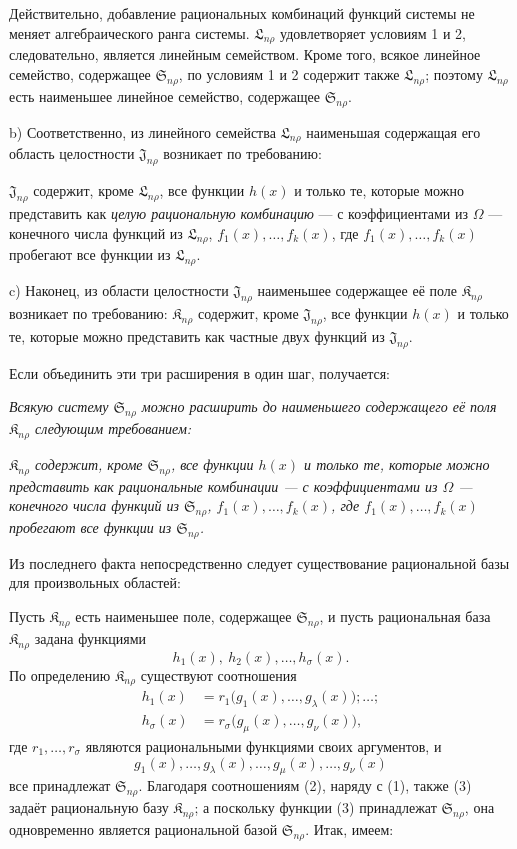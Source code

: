 \documentclass[11pt]{article}
\providecommand{\Kfield}{\mathfrak{K}}
\providecommand{\Ssys}{\mathfrak{S}}
\providecommand{\Jdom}{\mathfrak{J}}
\providecommand{\Lsys}{\mathfrak{L}}
\begin{document}
Действительно, добавление рациональных комбинаций функций системы не меняет алгебраического ранга системы. $\Lsys_{n\rho}$ удовлетворяет условиям 1 и 2, следовательно, является линейным семейством. Кроме того, всякое линейное семейство, содержащее $\Ssys_{n\rho}$, по условиям 1 и 2 содержит также $\Lsys_{n\rho}$; поэтому $\Lsys_{n\rho}$ есть наименьшее линейное семейство, содержащее $\Ssys_{n\rho}$.

b) Соответственно, из линейного семейства $\Lsys_{n\rho}$ наименьшая содержащая его область целостности $\Jdom_{n\rho}$ возникает по требованию:

$\Jdom_{n\rho}$ содержит, кроме $\Lsys_{n\rho}$, все функции $h(x)$ и только те, которые можно представить как \emph{целую рациональную комбинацию} --- с коэффициентами из $\Omega$ --- конечного числа функций из $\Lsys_{n\rho}$, $f_1(x),\ldots,f_k(x)$, где $f_1(x),\ldots,f_k(x)$ пробегают все функции из $\Lsys_{n\rho}$.

c) Наконец, из области целостности $\Jdom_{n\rho}$ наименьшее содержащее её поле $\Kfield_{n\rho}$ возникает по требованию: $\Kfield_{n\rho}$ содержит, кроме $\Jdom_{n\rho}$, все функции $h(x)$ и только те, которые можно представить как частные двух функций из $\Jdom_{n\rho}$.

Если объединить эти три расширения в один шаг, получается:

\emph{Всякую систему $\Ssys_{n\rho}$ можно расширить до наименьшего содержащего её поля $\Kfield_{n\rho}$ следующим требованием:}

\emph{$\Kfield_{n\rho}$ содержит, кроме $\Ssys_{n\rho}$, все функции $h(x)$ и только те, которые можно представить как рациональные комбинации --- с коэффициентами из $\Omega$ --- конечного числа функций из $\Ssys_{n\rho}$, $f_1(x),\ldots,f_k(x)$, где $f_1(x),\ldots,f_k(x)$ пробегают все функции из $\Ssys_{n\rho}$.}

Из последнего факта непосредственно следует существование рациональной базы для произвольных областей:

Пусть $\Kfield_{n\rho}$ есть наименьшее поле, содержащее $\Ssys_{n\rho}$, и пусть рациональная база $\Kfield_{n\rho}$ задана функциями
\begin{equation}
  h_1(x),\ h_2(x),\ldots,h_\sigma(x).
\tag{1}
\end{equation}
По определению $\Kfield_{n\rho}$ существуют соотношения
\begin{equation}
\begin{aligned}
 h_1(x)&=r_1\bigl(g_1(x),\ldots,g_\lambda(x)\bigr);\ldots;\\
 h_\sigma(x)&=r_\sigma\bigl(g_\mu(x),\ldots,g_\nu(x)\bigr),
\end{aligned}
\tag{2}
\end{equation}
где $r_1,\ldots,r_\sigma$ являются рациональными функциями своих аргументов, и
\begin{equation}
  g_1(x),\ldots,g_\lambda(x),\ldots,
  g_\mu(x),\ldots,g_\nu(x)
\tag{3}
\end{equation}
все принадлежат $\Ssys_{n\rho}$. Благодаря соотношениям (2), наряду с (1), также (3) задаёт рациональную базу $\Kfield_{n\rho}$; а поскольку функции (3) принадлежат $\Ssys_{n\rho}$, она одновременно является рациональной базой $\Ssys_{n\rho}$. Итак, имеем:
\end{document}
